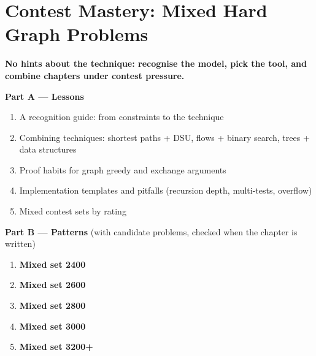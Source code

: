 \chapter{Contest Mastery: Mixed Hard Graph Problems}
\label{ch:mastery}

\begin{tcolorbox}[enhanced, colback=white, colframe=secondaryblue, boxrule=1pt, arc=2mm]
\textbf{\large\textcolor{primaryblue}{No hints about the technique: recognise the model, pick the tool, and combine chapters under contest pressure.}}
\end{tcolorbox}


\begin{plannedbox}
\textbf{Part A --- Lessons}
\begin{enumerate}[leftmargin=*, label=\textbf{A\arabic*.}, itemsep=1pt]
    \item A recognition guide: from constraints to the technique
    \item Combining techniques: shortest paths + DSU, flows + binary search, trees + data structures
    \item Proof habits for graph greedy and exchange arguments
    \item Implementation templates and pitfalls (recursion depth, multi-tests, overflow)
    \item Mixed contest sets by rating
\end{enumerate}
\textbf{Part B --- Patterns} (with candidate problems, checked when the chapter is written)
\begin{enumerate}[leftmargin=*, label=\textbf{P\arabic*.}, itemsep=1pt]
    \item \textbf{Mixed set 2400}
    \item \textbf{Mixed set 2600}
    \item \textbf{Mixed set 2800}
    \item \textbf{Mixed set 3000}
    \item \textbf{Mixed set 3200+}
\end{enumerate}
\end{plannedbox}
